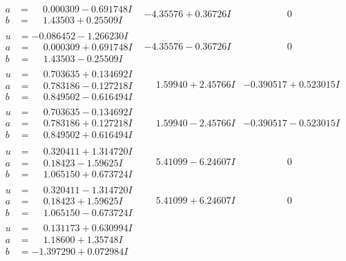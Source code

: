 \documentclass[1p]{elsarticle_modified}
\theoremstyle{definition}
\begin{document}
$$\begin{array}{c|c|c}
\begin{aligned}
a &= \phantom{-}0.000309 - 0.691748 I \\
b &= \phantom{-}1.43503 + 0.25509 I\end{aligned}
 & -4.35576 + 0.36726 I & \phantom{-0.000000 } 0 \\ \hline\begin{aligned}
u &= -0.086452 - 1.266230 I \\
a &= \phantom{-}0.000309 + 0.691748 I \\
b &= \phantom{-}1.43503 - 0.25509 I\end{aligned}
 & -4.35576 - 0.36726 I & \phantom{-0.000000 } 0 \\ \hline\begin{aligned}
u &= \phantom{-}0.703635 + 0.134692 I \\
a &= \phantom{-}0.783186 - 0.127218 I \\
b &= \phantom{-}0.849502 - 0.616494 I\end{aligned}
 & \phantom{-}1.59940 + 2.45766 I & -0.390517 + 0.523015 I \\ \hline\begin{aligned}
u &= \phantom{-}0.703635 - 0.134692 I \\
a &= \phantom{-}0.783186 + 0.127218 I \\
b &= \phantom{-}0.849502 + 0.616494 I\end{aligned}
 & \phantom{-}1.59940 - 2.45766 I & -0.390517 - 0.523015 I \\ \hline\begin{aligned}
u &= \phantom{-}0.320411 + 1.314720 I \\
a &= \phantom{-}0.18423 - 1.59625 I \\
b &= \phantom{-}1.065150 + 0.673724 I\end{aligned}
 & \phantom{-}5.41099 - 6.24607 I & \phantom{-0.000000 } 0 \\ \hline\begin{aligned}
u &= \phantom{-}0.320411 - 1.314720 I \\
a &= \phantom{-}0.18423 + 1.59625 I \\
b &= \phantom{-}1.065150 - 0.673724 I\end{aligned}
 & \phantom{-}5.41099 + 6.24607 I & \phantom{-0.000000 } 0 \\ \hline\begin{aligned}
u &= \phantom{-}0.131173 + 0.630994 I \\
a &= \phantom{-}1.18600 + 1.35748 I \\
b &= -1.397290 + 0.072984 I\end{aligned}

\end{array}$$
\end{document}
